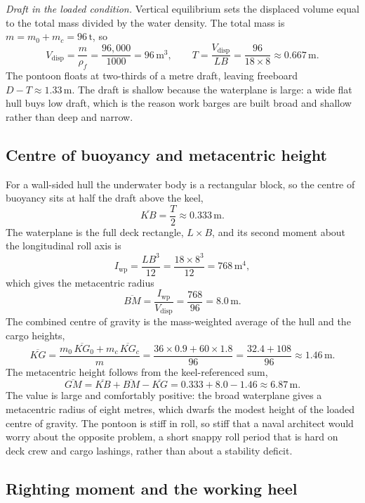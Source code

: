 \emph{Draft in the loaded condition.} Vertical equilibrium sets the
displaced volume equal to the total mass divided by the water density. The
total mass is $m = m_0 + m_c = 96\,\si{\tonne}$, so
\[
V_{\text{disp}} = \frac{m}{\rho_f} = \frac{96{,}000}{1000}
= 96\,\text{m}^3,
\qquad
T = \frac{V_{\text{disp}}}{L B} = \frac{96}{18 \times 8}
\approx 0.667\,\si{\meter}.
\]
The pontoon floats at two-thirds of a metre draft, leaving freeboard
$D - T \approx 1.33\,\si{\meter}$. The draft is shallow because the
waterplane is large: a wide flat hull buys low draft, which is the reason
work barges are built broad and shallow rather than deep and narrow.

\subsection{Centre of buoyancy and metacentric height}

For a wall-sided hull the underwater body is a rectangular block, so the
centre of buoyancy sits at half the draft above the keel,
\[
\overline{KB} = \frac{T}{2} \approx 0.333\,\si{\meter}.
\]
The waterplane is the full deck rectangle, $L \times B$, and its second
moment about the longitudinal roll axis is
\[
I_{\text{wp}} = \frac{L B^3}{12} = \frac{18 \times 8^3}{12}
= 768\,\text{m}^4,
\]
which gives the metacentric radius
\[
\overline{BM} = \frac{I_{\text{wp}}}{V_{\text{disp}}}
= \frac{768}{96} = 8.0\,\si{\meter}.
\]
The combined centre of gravity is the mass-weighted average of the hull
and the cargo heights,
\[
\overline{KG} = \frac{m_0\,\overline{KG}_0 + m_c\,\overline{KG}_c}{m}
= \frac{36 \times 0.9 + 60 \times 1.8}{96}
= \frac{32.4 + 108}{96}
\approx 1.46\,\si{\meter}.
\]
The metacentric height follows from the keel-referenced sum,
\[
\overline{GM} = \overline{KB} + \overline{BM} - \overline{KG}
= 0.333 + 8.0 - 1.46
\approx 6.87\,\si{\meter}.
\]
The value is large and comfortably positive: the broad waterplane gives a
metacentric radius of eight metres, which dwarfs the modest height of the
loaded centre of gravity. The pontoon is stiff in roll, so stiff that a
naval architect would worry about the opposite problem, a short snappy roll
period that is hard on deck crew and cargo lashings, rather than about a
stability deficit.

\subsection{Righting moment and the working heel}

